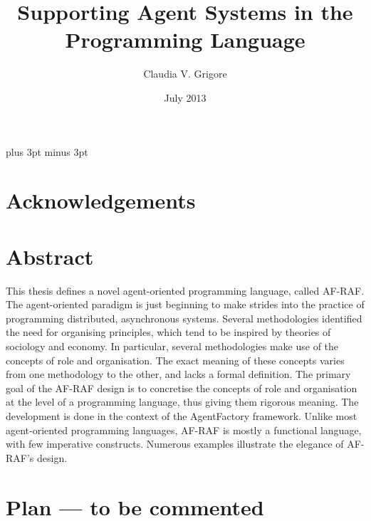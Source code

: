 \documentclass[a4paper,12pt,oneside]{book} %
\theoremstyle{remark}
\theoremstyle{plain}
\begin{document}
\overfullrule=5pt   %
\title{Supporting Agent Systems in the Programming Language} %
\author{Claudia V. Grigore}
\date{July 2013}
\maketitle

\tableofcontents
\listoffigures
\listoftables
\baselineskip=21.75pt
\parskip=3pt plus 3pt minus 3pt
\chapter*{Acknowledgements} %

\chapter*{Abstract} %

This thesis defines a novel agent-oriented programming language, called
AF-RAF\null.  The agent-oriented paradigm is just beginning to make strides
into the practice of programming distributed, asynchronous systems.
Several methodologies identified the need for organising principles, which
tend to be inspired by theories of sociology and economy.  In particular,
several methodologies make use of the concepts of role and organisation.
The exact meaning of these concepts varies from one methodology to the
other, and lacks a formal definition.  The primary goal of the AF-RAF
design is to concretise the concepts of role and organisation at the level
of a programming language, thus giving them rigorous meaning. The
development is done in the context of the AgentFactory framework.  Unlike
most agent-oriented programming languages, AF-RAF is mostly a functional
language, with few imperative constructs.  Numerous examples illustrate the
elegance of AF-RAF's design.


\chapter*{Plan --- to be commented} %
\end{document}

